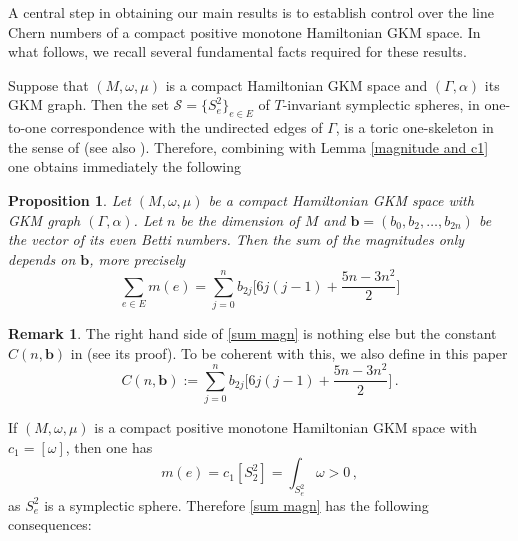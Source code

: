 \documentclass[12pt,a4paper]{amsart}
\newtheorem{prop}[thm]{Proposition}
\theoremstyle{plain}
\theoremstyle{definition}
\newtheorem{rem}[thm]{Remark}
\begin{document}
A central step in obtaining our main results is to establish control over the line Chern numbers of a compact positive monotone Hamiltonian GKM space. 
In what follows, we recall several fundamental facts required for these results.

Suppose that $(M,\omega,\mu)$ is a compact Hamiltonian GKM space and $(\Gamma, \alpha)$ its
GKM graph. Then the set $\mathcal{S}=\{S^2_e\}_{e\in E}$ of $T$-invariant symplectic spheres, in
one-to-one correspondence with the undirected edges of $\Gamma$, is a toric one-skeleton in the sense
of \cite[Def. 4.10, Lemma 4.11]{MR3695881} (see also \cite[Def. 4.13]{MR4940256}). Therefore, combining 
\cite[Thm. 1.5]{MR3695881} with Lemma \ref{magnitude and c1} one obtains immediately the following
\begin{prop}\label{magnitudes topological}
Let $(M, \omega, \mu)$ be a compact Hamiltonian GKM space with GKM graph $(\Gamma,\alpha)$. Let $n$ be the dimension of $M$ and $\mathbf{b}=(b_0,b_2,\ldots,b_{2n})$ 
be the vector of its even Betti numbers. Then the sum of the magnitudes only depends on $\mathbf{b}$, more precisely
\begin{equation}\label{sum magn}
\sum_{e\in E}m(e)= \sum_{j=0}^n b_{2j}\Big[ 6j(j-1)+\frac{5n-3n^2}{2}\Big]
\end{equation}
\end{prop}
\begin{rem}\label{remark magnitudes}
The right hand side of \eqref{sum magn} is nothing else but the constant $C(n,\mathbf{b})$
in \cite[Thm. 1.5]{MR3695881} (see its proof). To be coherent with this, we
also define in this paper
\begin{equation}\label{definition Cnb}
C(n,\mathbf{b}):=\sum_{j=0}^n b_{2j}\Big[ 6j(j-1)+\frac{5n-3n^2}{2}\Big]\,.
\end{equation}
\end{rem}
If $(M,\omega,\mu)$ is a compact positive monotone Hamiltonian GKM space with $c_1=[\omega]$, then one has 
\begin{equation}\label{magn pos}
m(e)=c_1[S^2_2]=\int_{S^2_e} \omega >0\,,
\end{equation}
as $S^2_e$ is a symplectic sphere. Therefore
\eqref{sum magn} has the following consequences:
\end{document}
